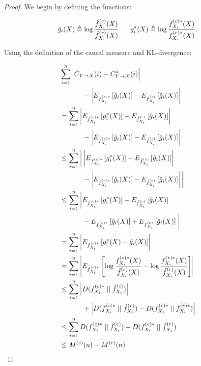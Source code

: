 \begin{proof}
We begin by defining the functions:

\begin{equation}
\hat{g}_i(X) \triangleq \log \frac{\hat{f}_{X_i}^{(c)}(X)}{\hat{f}_{X_i}^{(r)}(X)} \ \ \ \ \
g^*_i(X) \triangleq \log \frac{f_{X_i}^{(c)*}(X)}{f_{X_i}^{(r)*}(X)}.
\end{equation}

\noindent Using the definition of the causal measure and KL-divergence:

\begin{align}
&\sum_{i=1}^n \left| \estcyx(i) - \optcyx(i) \right|
\nonumber \\
& \ \ \ \ \ \ \ \ \ \ - \left|
E_{\optfxc{i}}\left[ \hat{g}_i(X)\right] -
E_{\estfxc{i}}\left[ \hat{g}_i(X)\right]
\right| \label{beginning} \\
&= \sum_{i=1}^n
\left|
E_{\optfxc{i}}\left[ g^*_i(X)\right] -
E_{\estfxc{i}}\left[ \hat{g}_i(X)\right]
\right| \nonumber \\
& \ \ \ \ \ \ \ \ \ \ - \left|
E_{\optfxc{i}}\left[ \hat{g}_i(X)\right] -
E_{\estfxc{i}}\left[ \hat{g}_i(X)\right]
\right| \\
&\le \sum_{i=1}^n
\bigg| \left|
E_{\optfxc{i}}\left[ g^*_i(X)\right] -
E_{\estfxc{i}}\left[ \hat{g}_i(X)\right]
\right| \nonumber \\
& \ \ \ \ \ \ \ \ \ \ - \left|
E_{\optfxc{i}}\left[ \hat{g}_i(X)\right] -
E_{\estfxc{i}}\left[ \hat{g}_i(X)\right]
\right| \bigg| \label{absval} \\
&\le \sum_{i=1}^n
\bigg|
E_{\optfxc{i}}\left[ g^*_i(X)\right] -
E_{\estfxc{i}}\left[ \hat{g}_i(X)\right] \nonumber \\
& \ \ \ \ \ \ \ \ \ \ -
E_{\optfxc{i}}\left[ \hat{g}_i(X)\right] +
E_{\estfxc{i}}\left[ \hat{g}_i(X)\right] \bigg| \label{rev_tri} \\
&= \sum_{i=1}^n \left|
E_{\optfxc{i}}\left[ g^*_i(X) - \hat{g}_i(X)\right] \right| \\
&= \sum_{i=1}^n \left|
E_{\optfxc{i}}\left[
\log \frac{\optfxc{i}(X)}{\estfxc{i}(X)}
- \log \frac{\optfxr{i}(X)}{\estfxr{i}(X)}
\right] \right| \\
&\le \sum_{i=1}^n \left|
\kl{\optfxc{i}}{\estfxc{i}} \right| \nonumber \\
& \ \ \ \ \ \ \ \ \ \ +
\left|
\kl{\optfxc{i}}{\estfxr{i}} -
\kl{\optfxc{i}}{\optfxr{i}}
\right| \label{tri} \\
&\le \sum_{i=1}^n
\kl{\optfxc{i}}{\estfxc{i}} +
\kl{\optfxc{i}}{\estfxr{i}} \label{assumption2} \\
&\le M^{(c)}(n) + M^{(r)}(n) \label{regretlemma}
\end{align}


\end{proof}
